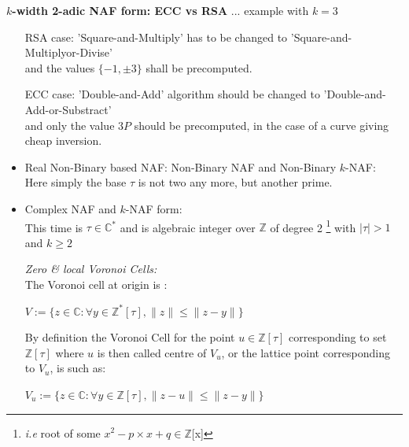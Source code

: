 \newpage
\textbf{$k$-width 2-adic NAF form: ECC vs RSA} ... example with $k=3$
\begin{itemize}
\item[RSA case:] 'Square-and-Multiply' has to be changed to 'Square-and-Multiplyor-Divise'\\
and the values $\{ - 1, \pm 3 \} $ shall be precomputed.\\ 
\item[ECC case:] 'Double-and-Add' algorithm should be changed to
'Double-and-Add-or-Substract' \\
and only the value $3P $ should be precomputed, in the case of a curve 
giving cheap inversion.

	\item Real Non-Binary based NAF: Non-Binary NAF and Non-Binary $k$-NAF:\\
    Here simply the base $\tau$ is not two any more, but another prime.    

	\item Complex NAF and $k$-NAF form:\\
		This time is $\tau \in \mathbb{C}^\ast$ and is algebraic integer over
		$\mathbb{Z}$ of degree 2 
		\footnote{\textit{i.e} root of some $x^2-p \times x + q \in \mathbb{Z}$[x]}
		with $|\tau| > 1$ and $k \geq 2$
 
	\begin{mydef}
	 \textit{Zero \& local Voronoi Cells:}\\
		The Voronoi cell at origin is :
 		\begin{center}
 		$V :=\{ z \in \mathbb{C}: \forall y \in \mathbb{Z}^{\ast}[\tau],
 		\|z\|\leq \|z-y\| \} $
 		\end{center}
 		 		By definition the Voronoi Cell for the point $u \in \mathbb{Z}[\tau]$ 
 		corresponding to set $\mathbb{Z}[\tau]$ where $u$ is then called 
 		centre of $V_u$, or the lattice point corresponding to $V_u$, is such as:
 		\begin{center}
 		$V_u :=\{ z \in \mathbb{C}: \forall y \in \mathbb{Z}[\tau],
 		\|z-u\|\leq \|z-y\| \} $
 		\end{center}
	\end{mydef}


\end{itemize}
